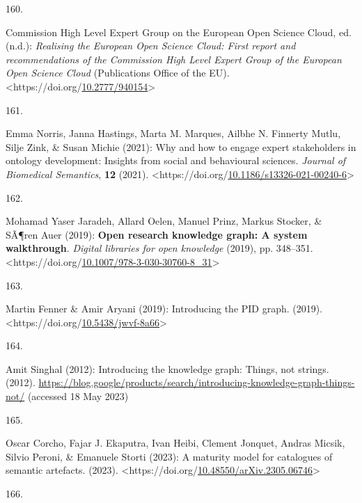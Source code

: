 \begin{thebibliography}{9}
\hypertarget{ref-10.2777ux2f940154}{}
160.

Commission High Level Expert Group on the European Open Science Cloud,
ed. (n.d.): \emph{Realising the {European Open Science Cloud}: First
report and recommendations of the {Commission High Level Expert Group}
of the {European Open Science Cloud}} ({Publications Office of the EU}).
\textless https://doi.org/\href{https://doi.org/10.2777/940154}{10.2777/940154}\textgreater{}

\hypertarget{ref-10.1186ux2fs13326-021-00240-6}{}
161.

Emma Norris, Janna Hastings, Marta M. Marques, Ailbhe N. Finnerty Mutlu,
Silje Zink, \& Susan Michie (2021): Why and how to engage expert
stakeholders in ontology development: Insights from social and
behavioural sciences. \emph{Journal of Biomedical Semantics},
\textbf{12} (2021).
\textless https://doi.org/\href{https://doi.org/10.1186/s13326-021-00240-6}{10.1186/s13326-021-00240-6}\textgreater{}

\hypertarget{ref-10.1007ux2f978-3-030-30760-8_31}{}
162.

Mohamad Yaser Jaradeh, Allard Oelen, Manuel Prinz, Markus Stocker, \&
SÃ¶ren Auer (2019): \textbf{Open research knowledge graph: A system
walkthrough}. \emph{Digital libraries for open knowledge} (2019), pp.
348--351.
\textless https://doi.org/\href{https://doi.org/10.1007/978-3-030-30760-8_31}{10.1007/978-3-030-30760-8\_31}\textgreater{}

\hypertarget{ref-10.5438ux2fjwvf-8a66}{}
163.

Martin Fenner \& Amir Aryani (2019): Introducing the PID graph. (2019).
\textless https://doi.org/\href{https://doi.org/10.5438/jwvf-8a66}{10.5438/jwvf-8a66}\textgreater{}

\hypertarget{ref-singhal2012}{}
164.

Amit Singhal (2012): Introducing the knowledge graph: Things, not
strings. (2012).
\url{https://blog.google/products/search/introducing-knowledge-graph-things-not/}
(accessed 18 May 2023)

\hypertarget{ref-10.48550ux2farXiv.2305.06746}{}
165.

Oscar Corcho, Fajar J. Ekaputra, Ivan Heibi, Clement Jonquet, Andras
Micsik, Silvio Peroni, \& Emanuele Storti (2023): A maturity model for
catalogues of semantic artefacts. (2023).
\textless https://doi.org/\href{https://doi.org/10.48550/arXiv.2305.06746}{10.48550/arXiv.2305.06746}\textgreater{}

\hypertarget{ref-faircookbook}{}
166.


\end{thebibliography}
